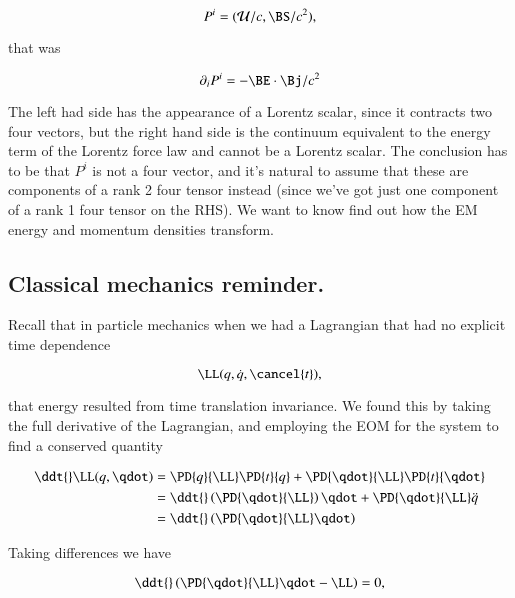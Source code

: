 \begin{equation}\label{eqn:relativisticElectrodynamicsL21:340}
P^i = (\mathcal{U}/c, \BS/c^2),
\end{equation}

that was

\begin{equation}\label{eqn:relativisticElectrodynamicsL21:360}
\partial_i P^i = - \BE \cdot \Bj/c^2
\end{equation}

The left had side has the appearance of a Lorentz scalar, since it contracts two four vectors, but the right hand side is the continuum equivalent to the energy term of the Lorentz force law and cannot be a Lorentz scalar.  The conclusion has to be that $P^i$ is not a four vector, and it's natural to assume that these are components of a rank 2 four tensor instead (since we've got just one component of a rank 1 four tensor on the RHS).  We want to know find out how the EM energy and momentum densities transform.

\subsection{Classical mechanics reminder.}

Recall that in particle mechanics when we had a Lagrangian that had no explicit time dependence

\begin{equation}\label{eqn:relativisticElectrodynamicsL21:380}
\LL(q, \dot{q}, \cancel{t}),
\end{equation}

that energy resulted from time translation invariance.  We found this by taking the full derivative of the Lagrangian, and employing the EOM for the system to find a conserved quantity

\begin{align*}
\ddt{} \LL(q, \qdot) 
&=
\PD{q}{\LL} \PD{t}{q}
+\PD{\qdot}{\LL} \PD{t}{\qdot} \\
&=
\ddt{} \left( \PD{\qdot}{\LL} \right) \qdot
+\PD{\qdot}{\LL} \ddot{q} \\
&=
\ddt{} \left( \PD{\qdot}{\LL} \qdot \right) 
\end{align*}

Taking differences we have

\begin{equation}\label{eqn:relativisticElectrodynamicsL21:400}
\ddt{} \left( \PD{\qdot}{\LL} \qdot -\LL \right) = 0,
\end{equation}

